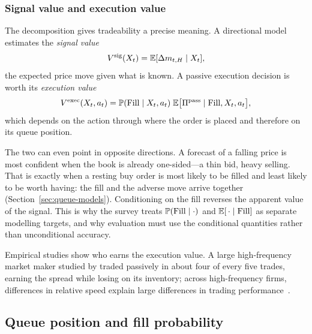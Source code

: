 \subsubsection{Signal value and execution value}
\label{sec:tradeability-framework}

The decomposition gives tradeability a precise meaning. A directional model estimates the
\emph{signal value}
\begin{equation}
  V^{\text{sig}}(X_t) = \mathbb{E}[\Delta m_{t,H} \mid X_t],
\end{equation}
the expected price move given what is known. A passive execution decision is worth its
\emph{execution value}
\begin{equation}
  V^{\text{exec}}(X_t, a_t) = \mathbb{P}(\mathrm{Fill} \mid X_t, a_t)\; \mathbb{E}\big[\Pi^{\text{pass}} \mid \mathrm{Fill}, X_t, a_t\big],
\end{equation}
which depends on the action through where the order is placed and therefore on its queue position.

The two can even point in opposite directions. A forecast of a falling price is most confident when
the book is already one-sided---a thin bid, heavy selling. That is exactly when a resting buy order is
most likely to be filled and least likely to be worth having: the fill and the adverse move arrive
together (Section~\ref{sec:queue-models}). Conditioning on the fill reverses the apparent value of the
signal. This is why the survey treats $\mathbb{P}(\mathrm{Fill} \mid \cdot)$ and $\mathbb{E}[\,\cdot \mid \mathrm{Fill}]$ as separate
modelling targets, and why evaluation must use the conditional quantities rather than unconditional
accuracy.

Empirical studies show who earns the execution value. A large high-frequency market maker studied
by \citet{menkveld2013} traded passively in about four of every five trades, earning the spread while
losing on its inventory; across high-frequency firms, differences in relative speed explain large
differences in trading performance~\citep{baron2019}.

\subsection{Queue position and fill probability}
\label{sec:queue-position}

